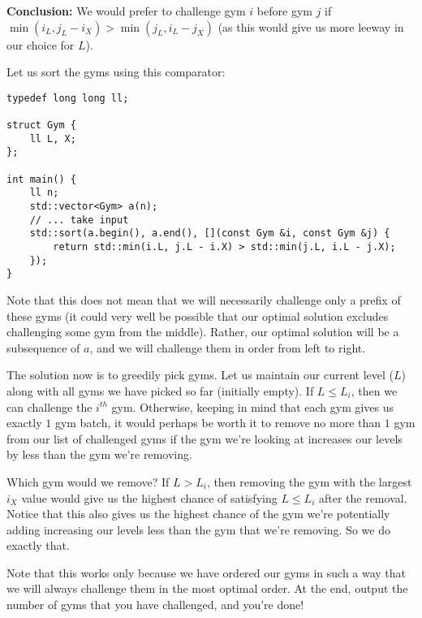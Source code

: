 \documentclass{article}
\begin{document}
\textbf{Conclusion:} We would prefer to challenge gym $i$ before gym $j$ if $\min(i_L,j_L-i_X) > \min(j_L,i_L-j_X)$ (as this would give us more leeway in our choice for $L$).

Let us sort the gyms using this comparator:
\begin{verbatim}
typedef long long ll;

struct Gym {
    ll L, X;
};

int main() {
    ll n;
    std::vector<Gym> a(n);
    // ... take input
    std::sort(a.begin(), a.end(), [](const Gym &i, const Gym &j) {
        return std::min(i.L, j.L - i.X) > std::min(j.L, i.L - j.X);
    });
}
\end{verbatim}

Note that this does not mean that we will necessarily challenge only a prefix of these gyms (it could very well be possible that our optimal solution excludes challenging some gym from the middle). Rather, our optimal solution will be a subsequence of $a$, and we will challenge them in order from left to right.

The solution now is to greedily pick gyms. Let us maintain our current level ($L$) along with all gyms we have picked so far (initially empty). If $L\le L_i$, then we can challenge the $i^{th}$ gym. Otherwise, keeping in mind that each gym gives us exactly $1$ gym batch, it would perhaps be worth it to remove no more than $1$ gym from our list of challenged gyms if the gym we're looking at increases our levels by less than the gym we're removing.

Which gym would we remove? If $L>L_i$, then removing the gym with the largest $i_X$ value would give us the highest chance of satisfying $L\le L_i$ after the removal. Notice that this also gives us the highest chance of the gym we're potentially adding increasing our levels less than the gym that we're removing. So we do exactly that.

Note that this works only because we have ordered our gyms in such a way that we will always challenge them in the most optimal order. At the end, output the number of gyms that you have challenged, and you're done!
\end{document}
